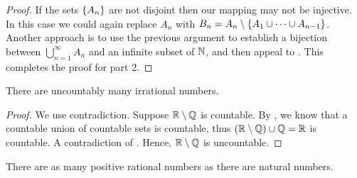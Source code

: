 \begin{proof}
  If the sets $\{ A_n \}$ are not disjoint then our mapping may not
  be injective. In this case we could again replace $A_n$ with $B_n =
  A_n \setminus \{ A_1 \cup \dots \cup A_{n - 1} \}$. Another
  approach is to use the previous argument to establish a bijection
  between $\bigcup_{n = 1}^{\infty} A_n$ and an infinite subset of
  $\mathbb N$, and then appeal to .
  This completes the proof for part 2.
\end{proof}

\begin{theorem}
  There are uncountably many irrational numbers.
\end{theorem}

\begin{proof}
  We use contradiction. Suppose $\mathbb R \setminus \mathbb Q$ is countable. By
  , we know that a countable union
  of countable sets is countable, thus $(\mathbb R \setminus \mathbb Q) \cup \mathbb Q
  = \mathbb R$ is countable. A contradiction of .
  Hence, $\mathbb R \setminus \mathbb Q$ is uncountable.
\end{proof}

\begin{theorem}[$\size{\QQ_+} = \size{\NN}$]
  There are as many positive rational numbers as there are natural numbers.
\end{theorem}


